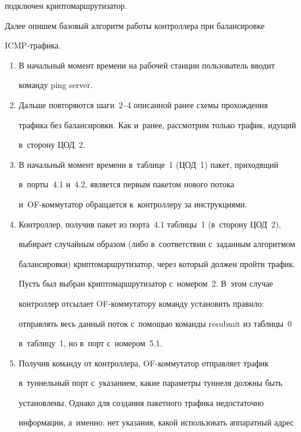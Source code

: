 подключен криптомаршрутизатор.


  


  Далее опишем базовый алгоритм работы контроллера при балансировке 


ICMP-тра\-фика.


  \begin{enumerate}[1.]


\item В начальный момент времени на рабочей станции пользователь вводит 


команду ping server.


\item Дальше повторяются шаги~2--4 описанной ранее схемы прохождения 


трафика без балансировки. Как и~ранее, рассмотрим только трафик, идущий 


в~сторону ЦОД~2.


\item В начальный момент времени в~таблице~1 (ЦОД~1) пакет, приходящий 


в~порты~4.1 и~4.2, является первым пакетом нового потока  


и~OF-ком\-му\-та\-тор обращается к~контроллеру за инструкциями.


\item Контроллер, получив пакет из порта~4.1 таблицы~1 (в~сторону ЦОД~2), 


выбирает случайным образом (либо в~соответствии с~заданным алгоритмом 


балансировки) криптомаршрутизатор, через который должен пройти трафик. 


Пусть был выбран криптомаршрутизатор с~номером~2. В~этом случае 


конт\-рол\-лер отсылает OF-ком\-му\-та\-то\-ру команду установить правило: 


отправлять весь данный поток с~помощью команды resubmit из таблицы~0 


в~таблицу~1, но в~порт с~номером~5.1.


\item Получив команду от контроллера, OF-ком\-му\-та\-тор отправляет трафик 


в~туннельный порт с~указанием, какие параметры туннеля должны быть 


уста\-нов\-ле\-ны. Однако для создания пакетного трафика недостаточно 


информации, а~именно: нет указания, какой использовать аппаратный адрес 



\end{enumerate}
